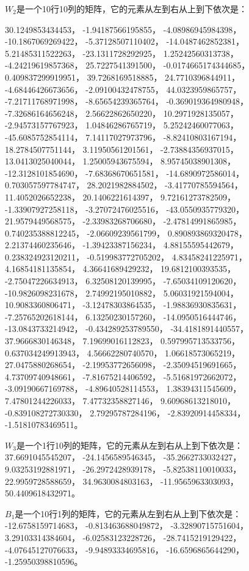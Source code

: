 \documentclass{ctexart}
\begin{document}
$W_2$是一个10行10列的矩阵，它的元素从左到右从上到下依次是：

30.1249853434453，	-1.94187566195855，	-4.08986945984398，	-10.1867069269422，	-5.37128507110402，	-14.0487462852381，	5.21485311522263，	-23.1311728292925，	1.25242560313738，	-4.24219619857368，
25.7227541391500，	-0.0174665174344685，	0.409837299919951，	39.7268169518885，	24.7710396844911，	-4.68446426673656，	-2.09100432478755，	44.0323959865757，	-7.21711768971998，	-8.65654239365764，
-0.369019364980948，	-7.32686164656248，	2.56622862650220，	10.2971928135057，	-2.94573157767923，	1.04846286765719，	5.25242460077063，	-45.6085752854114，	7.14117027973796，	-8.82410803167194，
18.2784507751144，	3.11950561201561，	-2.73884356937015，	13.0413025040044，	1.25005943675594，	8.95745038901308，	-12.3128101854690，	-7.68368670651581，	-14.6890972586014，	0.703057597784747，
28.2021982884502，	-3.41770785594564，	11.4052026652238，	20.1406221614397，	9.72161273782509，	-1.33907927258118，	-3.27072476025516，	-43.0550935779320，	21.9579449568575，	-2.33983268706680，
-2.47814991865985，	0.740235388812245，	-2.06609239561799，	0.890893869320478，	2.21374460235646，	-1.39423387156234，	4.88155595442679，	0.238324923120211，	-0.519983772705202，	4.83458241225971，
4.16854181135854，	4.36641689429232，	19.6812100393535，	-2.75047226634913，	6.32508120139995，	-7.65034109120620，	-10.9826098231678，	2.74992195010882，	5.06031921594004，	10.9083360806471，
-3.12478303864535，	-1.98836930835631，	-7.25765202618144，	6.13250230157260，	-14.0950516444746，	-13.0843733214942，	-0.434289253789550，	-34.4181891440557，	37.9666830146348，	7.19699016112823，
0.597995713533756，	0.637034249913943，	4.56662280740570，	1.06618573065219，	27.0475880268654，	-2.19953772656098，	-2.35094519691665，	4.73709740948661，	-7.81675214406592，	-5.51681972662072，
-3.09190667169788，	-4.89640528114553，	1.38394311545609，	7.47801244226033，	7.47732358827146，	9.60968613218010，	-0.839108272730330，	2.79295787284196，	-2.83920914458334，	-1.51810783469511。

$W_3$是一个1行10列的矩阵，它的元素从左到右从上到下依次是：
37.6691045545207，	-24.1456589546345，	-35.2662733032427，	9.03253192881971，	-26.2972428939178，	-5.82538110010033，	22.9959728588659，	34.9630084803163，	-11.9565963303093，	50.4409618432971。

$B_1$是一个10行1列的矩阵，它的元素从左到右从上到下依次是：
-12.6758159714683，
-0.813463688049872，
-3.32890715751604，
3.29103314384604，
-6.02583123228726，
-28.7415219129422，
-4.07645127076633，
-9.94893334695816，
-16.6596865644290，
-1.25950398810596。
\end{document}
